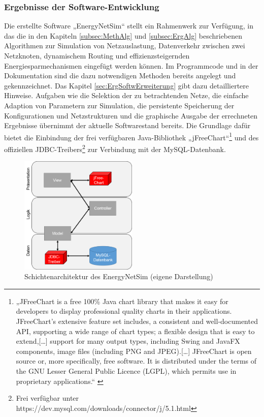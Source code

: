 \documentclass[12pt,titlepage]{article}
\begin{document}
\subsubsection{Ergebnisse der Software-Entwicklung}
Die erstellte Software „EnergyNetSim“ stellt ein Rahmenwerk zur Verfügung, in das die in den Kapiteln 
\ref{subsec:MethAlg} und \ref{subsec:ErgAlg} beschriebenen Algorithmen zur Simulation von Netzauslastung, Datenverkehr zwischen zwei Netzknoten, dynamischem Routing und effizienzsteigernden Energiesparmechanismen eingefügt werden können. Im Programmcode und in der Dokumentation sind die dazu notwendigen Methoden bereits angelegt und gekennzeichnet. Das Kapitel \ref{sec:ErgSoftwErweiterung} gibt dazu detailliertere Hinweise. 
Aufgaben wie die Selektion der zu betrachtenden Netze, die einfache Adaption von Parametern zur Simulation, die persistente Speicherung der Konfigurationen und Netzstrukturen und die graphische Ausgabe der errechneten Ergebnisse übernimmt der aktuelle Softwarestand bereits. Die Grundlage dafür bietet die Einbindung der frei verfügbaren Java-Bibliothek „jFreeChart“\footnote{„JFreeChart is a free 100\% Java chart library that makes it easy for developers to display professional quality charts in their applications. JFreeChart's extensive feature set includes, a consistent and well-documented API, supporting a wide range of chart types; a flexible design that is easy to extend,[…] support for many output types, including Swing and JavaFX components, image files (including PNG and JPEG).[…] JFreeChart is open source or, more specifically, free software. It is distributed under the terms of the GNU Lesser General Public Licence (LGPL), which permits use in proprietary applications.“ \cite{jdbc}} und des offiziellen JDBC-Treibers\footnote{Frei verfügbar unter https://dev.mysql.com/downloads/connector/j/5.1.html} zur Verbindung mit der MySQL-Datenbank.
\begin{figure}[!ht]
	\centering
	\includegraphics[width=0.5\textwidth]{ErgSoftwareMVC}
	\caption{Schichtenarchitektur des EnergyNetSim (eigene Darstellung)}
	\label{fig:ErgSoftwareMVC}
\end{figure}
\end{document}
